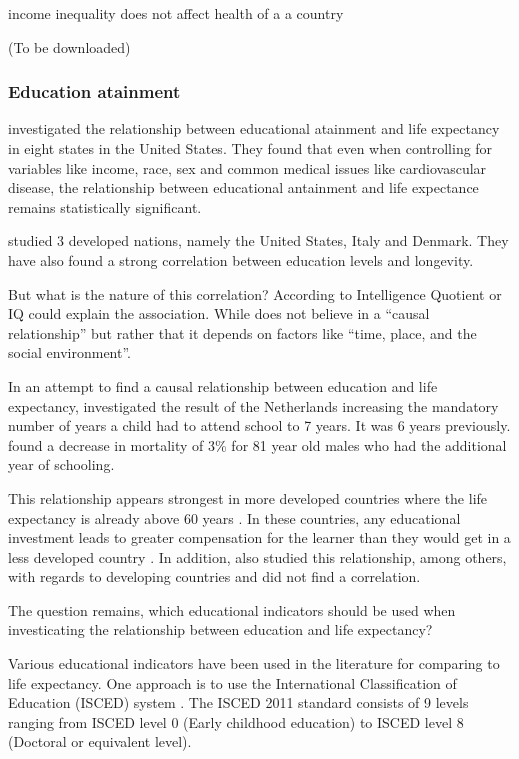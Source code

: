 \documentclass[10pt,a4paper]{article}
\begin{document}
income inequality does not affect health of a a country \cite{JasonBeckfield2004}

\cite{Tarkiainen2012} (To be downloaded)

\subsubsection{Education atainment}


\cite{Kaplan2015} investigated the relationship between educational atainment and life expectancy in eight states in the United States. They found that even when controlling for variables like income, race, sex and common medical issues like cardiovascular disease, the relationship between educational antainment and life expectance remains statistically significant.

\cite{Luy2019} studied 3 developed nations, namely the United States, Italy and Denmark. They have also found a strong correlation between education levels and longevity.



But what is the nature of this correlation? According to \cite{Deary2004} Intelligence Quotient or IQ could explain the association. While \cite{Hayward2015} does not believe in a ``causal relationship'' but rather that it depends on factors like ``time, place, and the social environment''.

In an attempt to find a causal relationship between education and life expectancy, \cite{VanKippersluis2009} investigated the result of the Netherlands increasing the mandatory number of years a child had to attend school to 7 years. It was 6 years previously. \cite{VanKippersluis2009} found a decrease in mortality of 3\% for 81 year old males who had the additional year of schooling. 

This relationship appears strongest in more developed countries where the life expectancy is already above 60 years \citep{Bulled2010}. In these countries, any educational investment leads to greater compensation for the learner than they would get in a less developed country \cite{Bulled2010,Handwerker1986}. In addition, \cite{Kabir2008} also studied this relationship, among others, with regards to developing countries and did not find a correlation.

The question remains, which educational indicators should be used when investicating the relationship between education and life expectancy?

Various educational indicators have been used in the literature for comparing to life expectancy. One approach is to use the International Classification of Education (ISCED) system \citep{UNESCO2012}. The ISCED 2011 standard consists of 9 levels ranging from ISCED level 0 (Early childhood education) to ISCED level 8 (Doctoral or equivalent level).
\end{document}
